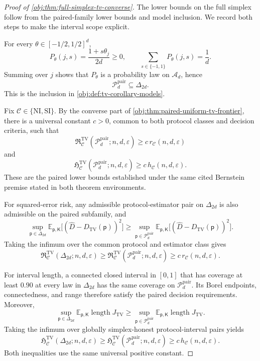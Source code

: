 \documentclass[11pt]{article}
\begin{document}
\begin{proof}[Proof of \cref{obj:thm:full-simplex-tv-converse}]
The lower bounds on the full simplex follow from the paired-family lower bounds and model inclusion. We record both steps to make the interval scope explicit.

For every \(\theta\in[-1/2,1/2]^d\),
\[
P_\theta(j,s)=\frac{1+s\theta_j}{2d}\ge0,
\qquad
\sum_{s\in\{-1,1\}}P_\theta(j,s)=\frac1d.
\]
Summing over \(j\) shows that \(P_\theta\) is a probability law on \(\mathcal A_d\), hence
\[
\mathcal P_d^{\mathrm{pair}}\subseteq\Delta_{2d}.
\]
This is the inclusion in \cref{obj:def:tv-corollary-models}. %

Fix \(\mathcal C\in\{\mathrm{NI},\mathrm{SI}\}\). By the converse part of \cref{obj:thm:paired-uniform-tv-frontier}, there is a universal constant \(c>0\), common to both protocol classes and decision criteria, such that
\[
\mathfrak R^{\mathrm{TV}}_{\mathcal C}
 (\mathcal P_d^{\mathrm{pair}};n,d,\varepsilon)
\ge c\,r_{\mathcal C}(n,d,\varepsilon)
\]
and
\[
\mathfrak H^{\mathrm{TV}}_{\mathcal C}
 (\mathcal P_d^{\mathrm{pair}};n,d,\varepsilon)
\ge c\,h_{\mathcal C}(n,d,\varepsilon).
\]
These are the paired lower bounds established under the same cited Bernstein premise stated in both theorem environments.

For squared-error risk, any admissible protocol-estimator pair on \(\Delta_{2d}\) is also admissible on the paired subfamily, and
\[
\sup_{\mathsf p\in\Delta_{2d}}
 \mathbb E_{\mathsf p,\mathsf K}
 \bigl[(\widehat D-D_{\mathrm{TV}}(\mathsf p))^2\bigr]
\ge
\sup_{\mathsf p\in\mathcal P_d^{\mathrm{pair}}}
 \mathbb E_{\mathsf p,\mathsf K}
 \bigl[(\widehat D-D_{\mathrm{TV}}(\mathsf p))^2\bigr].
\]
Taking the infimum over the common protocol and estimator class gives
\[
\mathfrak R^{\mathrm{TV}}_{\mathcal C}
 (\Delta_{2d};n,d,\varepsilon)
\ge
\mathfrak R^{\mathrm{TV}}_{\mathcal C}
 (\mathcal P_d^{\mathrm{pair}};n,d,\varepsilon)
\ge c\,r_{\mathcal C}(n,d,\varepsilon).
\]

For interval length, a connected closed interval in \([0,1]\) that has coverage at least \(0.90\) at every law in \(\Delta_{2d}\) has the same coverage on \(\mathcal P_d^{\mathrm{pair}}\). Its Borel endpoints, connectedness, and range therefore satisfy the paired decision requirements. Moreover,
\[
\sup_{\mathsf p\in\Delta_{2d}}
 \mathbb E_{\mathsf p,\mathsf K}\operatorname{length}J_{\mathrm{TV}}
\ge
\sup_{\mathsf p\in\mathcal P_d^{\mathrm{pair}}}
 \mathbb E_{\mathsf p,\mathsf K}\operatorname{length}J_{\mathrm{TV}}.
\]
Taking the infimum over globally simplex-honest protocol-interval pairs yields
\[
\mathfrak H^{\mathrm{TV}}_{\mathcal C}
 (\Delta_{2d};n,d,\varepsilon)
\ge
\mathfrak H^{\mathrm{TV}}_{\mathcal C}
 (\mathcal P_d^{\mathrm{pair}};n,d,\varepsilon)
\ge c\,h_{\mathcal C}(n,d,\varepsilon).
\]
Both inequalities use the same universal positive constant. %
\end{proof}
\end{document}
